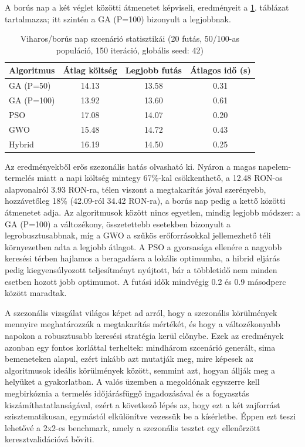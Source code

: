 A borús nap a két véglet közötti átmenetet képviseli, eredményeit a \ref{tab:cloudy_stats}. táblázat tartalmazza; itt szintén a GA (P=100) bizonyult a legjobbnak.
\begin{table}[H]
\centering
\caption{Viharos/borús nap szcenárió statisztikái (20 futás, 50/100-as populáció, 150 iteráció, globális seed: 42)}
\label{tab:cloudy_stats}
\begin{tabular}{lccc}
\toprule
Algoritmus & Átlag költség & Legjobb futás & Átlagos idő (s) \\
\midrule
GA (P=50)  & 14.13 & 13.58 & 0.31 \\
GA (P=100) & 13.92 & 13.60 & 0.61 \\
PSO        & 17.08 & 14.07 & 0.20 \\
GWO        & 15.48 & 14.72 & 0.43 \\
Hybrid     & 16.19 & 14.50 & 0.25 \\
\bottomrule
\end{tabular}
\end{table}

Az eredményekből erős szezonális hatás olvasható ki. Nyáron a magas napelem-termelés miatt a napi költség mintegy 67\%-kal csökkenthető, a 12.48 RON-os alapvonalról 3.93 RON-ra, télen viszont a megtakarítás jóval szerényebb, hozzávetőleg 18\% (42.09-ról 34.42 RON-ra), a borús nap pedig a kettő közötti átmenetet adja. Az algoritmusok között nincs egyetlen, mindig legjobb módszer: a GA (P=100) a változékony, összetettebb esetekben bizonyult a legrobusztusabbnak, míg a GWO a szűkös erőforrásokkal jellemezhető téli környezetben adta a legjobb átlagot. A PSO a gyorsasága ellenére a nagyobb keresési térben hajlamos a beragadásra a lokális optimumba, a hibrid eljárás pedig kiegyensúlyozott teljesítményt nyújtott, bár a többletidő nem minden esetben hozott jobb optimumot. A futási idők mindvégig 0.2 és 0.9 másodperc között maradtak.

A szezonális vizsgálat világos képet ad arról, hogy a szezonális körülmények mennyire meghatározzák a megtakarítás mértékét, és hogy a változékonyabb napokon a robusztusabb keresési stratégia kerül előnybe. Ezek az eredmények azonban egy fontos korláttal terheltek: mindhárom szcenárió generált, sima bemeneteken alapul, ezért inkább azt mutatják meg, mire képesek az algoritmusok ideális körülmények között, semmint azt, hogyan állják meg a helyüket a gyakorlatban. A valós üzemben a megoldónak egyszerre kell megbirkóznia a termelés időjárásfüggő ingadozásával és a fogyasztás kiszámíthatatlanságával, ezért a következő lépés az, hogy ezt a két zajforrást szisztematikusan, egymástól elkülönítve vezessük be a kísérletbe. Éppen ezt teszi lehetővé a 2x2-es benchmark, amely a szezonális tesztet egy ellenőrzött keresztvalidációvá bővíti.

